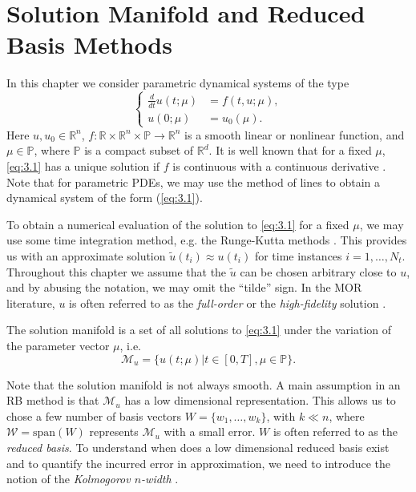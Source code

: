 \section{Solution Manifold and Reduced Basis Methods} \label{sec:3.1}
In this chapter we consider parametric dynamical systems of the type
\begin{equation} \label{eq:3.1}
\left\{
\begin{aligned}
	\frac d{dt} u(t;\mu) &= f(t,u;\mu),\\
	u(0;\mu) &= u_0(\mu).
\end{aligned}
\right.
\end{equation}
Here $u,u_0\in \mathbb R^{n}$, $f:\mathbb R \times \mathbb R^{n} \times \mathbb P\to \mathbb R^{n}$ is a smooth linear or nonlinear function, and $\mu \in \mathbb P$, where $\mathbb P$ is a compact subset of $\mathbb R^d$. It is well known that for a fixed $\mu$, \cref{eq:3.1} has a unique solution if $f$ is continuous with a continuous derivative \cite{rudin1976principles}. Note that for parametric PDEs, we may use the method of lines \cite{edsberg2015introduction} to obtain a dynamical system of the form (\ref{eq:3.1}).

To obtain a numerical evaluation of the solution to \cref{eq:3.1} for a fixed $\mu$, we may use some time integration method, e.g. the Runge-Kutta methods \cite{edsberg2015introduction}. This provides us with an approximate solution $\tilde u(t_i) \approx u(t_i)$ for time instances $i = 1 , \dots , N_t$. Throughout this chapter we assume that the $\tilde u$ can be chosen arbitrary close to $u$, and by abusing the notation, we may omit the ``tilde'' sign. In the MOR literature, $u$ is often referred to as the \emph{full-order} or the \emph{high-fidelity} solution \cite{hesthaven2015certified,quarteroni2015reduced}. 

\begin{definition}
The solution manifold is a set of all solutions to \cref{eq:3.1} under the variation of the parameter vector $\mu$, i.e.
\begin{equation} \label{eq:3.2}
	\mathcal M_{u} = \{ u(t;\mu) | t \in [0,T] , \mu \in \mathbb P \}.
\end{equation}
\end{definition}
Note that the solution manifold is not always smooth. A main assumption in an RB method is that $\mathcal M_{u}$ has a low dimensional representation. This allows us to chose a few number of basis vectors $W = \{ w_1,\dots,w_k\}$, with $k\ll n$, where $\mathcal W = \text{span}(W)$ represents $\mathcal M_{u}$ with a small error. $W$ is often referred to as the \emph{reduced basis}. To understand when does a low dimensional reduced basis exist and to quantify the incurred error in approximation, we need to introduce the notion of the \emph{Kolmogorov $n$-width} \cite{Kolmogoroff:1936fj,pinkus1985n}.

